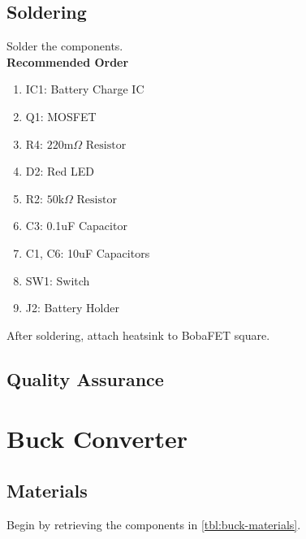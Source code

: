 \documentclass{article}
\newcommand{\resistor}[1]{$\text{#1} \Omega \text{ Resistor}$}
\begin{document}
\subsection{Soldering}

Solder the components. \\

\noindent \textbf{Recommended Order}

\begin{enumerate}
  \item IC1: Battery Charge IC
  \item Q1: MOSFET
  \item R4: \resistor{220m} 
  \item D2: Red LED
  \item R2: \resistor{50k}
  \item C3: 0.1uF Capacitor
  \item C1, C6: 10uF Capacitors 
  \item SW1: Switch
  \item J2: Battery Holder
\end{enumerate}

After soldering, attach heatsink to BobaFET square.

\subsection{Quality Assurance}

\section{Buck Converter}

\subsection{Materials}
Begin by retrieving the components in \autoref{tbl:buck-materials}.
\end{document}
